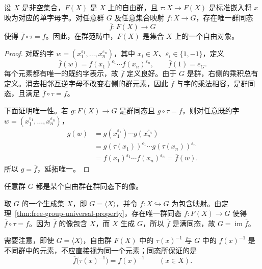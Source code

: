 \begin{theorem}[自由群的泛性质]\label{thm:free-group-universal-property}
设 $X$ 是非空集合，$F(X)$ 是 $X$ 上的自由群，且 $\tau:X\to F(X)$ 是标准嵌入将 $x$ 映为对应的单字母字。对任意群 $G$ 及任意集合映射 $f:X\to G$，存在唯一群同态
\[
  \overline f:F(X)\longrightarrow G
\]
使得 $\overline f\circ\tau=f$。因此，在群范畴中，$F(X)$ 是集合 $X$ 上的一个自由对象。
\end{theorem}

\begin{proof}
对既约字 $w=(x_1^{\varepsilon_1},\ldots,x_n^{\varepsilon_n})$，其中 $x_i\in X$、$\varepsilon_i\in\{1,-1\}$，定义
\[
  \overline f(w)=f(x_1)^{\varepsilon_1}\cdots f(x_n)^{\varepsilon_n},
  \qquad \overline f(1)=e_G.
\]
每个元素都有唯一的既约字表示，故 $\overline f$ 定义良好。由于 $G$ 是群，右侧的乘积总有定义。消去相邻互逆字母不改变右侧的群元素，因此 $\overline f$ 与字的乘法相容，是群同态，且满足 $\overline f\circ\tau=f$。

下面证明唯一性。若 $g:F(X)\to G$ 是群同态且 $g\circ\tau=f$，则对任意既约字 $w=(x_1^{\varepsilon_1},\ldots,x_n^{\varepsilon_n})$，
\begin{align*}
  g(w)
  &=g(x_1^{\varepsilon_1})\cdots g(x_n^{\varepsilon_n})\\
  &=g(\tau(x_1))^{\varepsilon_1}\cdots g(\tau(x_n))^{\varepsilon_n}\\
  &=f(x_1)^{\varepsilon_1}\cdots f(x_n)^{\varepsilon_n}
   =\overline f(w).
\end{align*}
所以 $g=\overline f$，延拓唯一。
\end{proof}

\begin{corollary}\label{cor:every-group-quotient-of-free}
任意群 $G$ 都是某个自由群在群同态下的像。
\end{corollary}

\begin{purpleproof}
取 $G$ 的一个生成集 $X$，即 $G=\langle X\rangle$，并令 $f:X\hookrightarrow G$ 为包含映射。由定理~\ref{thm:free-group-universal-property}，存在唯一群同态 $\overline f:F(X)\to G$ 使得 $\overline f\circ\tau=f$。因为 $\overline f$ 的像包含 $X$，而 $X$ 生成 $G$，所以 $\overline f$ 是满同态，故 $G=\operatorname{im}\overline f$。

需要注意，即使 $G=\langle X\rangle$，自由群 $F(X)$ 中的 $\tau(x)^{-1}$ 与 $G$ 中的 $f(x)^{-1}$ 是不同群中的元素，不应直接视为同一个元素；同态所保证的是
\[
  \overline f\bigl(\tau(x)^{-1}\bigr)=f(x)^{-1}\qquad(x\in X).
\]
\end{purpleproof}

